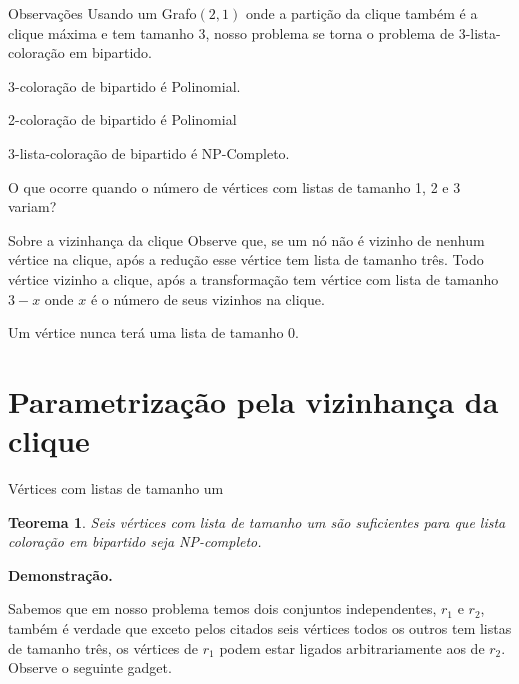 \documentclass[9pt, compress]{beamer}
\newtheorem{teorema}{Teorema}
\newcommand{\?}{\textcolor{warn}{\textit{?}}}
\begin{document}
     \begin{frame}{Observações}
       Usando um Grafo$(2,1)$ onde a partição da clique também é a clique máxima e tem tamanho 3, nosso problema se torna o problema de 3-lista-coloração em bipartido.
       
       3-coloração de bipartido é Polinomial.
       
       2-coloração de bipartido é Polinomial 
       
       3-lista-coloração de bipartido é NP-Completo.
       
       O que ocorre quando o número de vértices com listas de tamanho 1, 2 e 3 variam? 
     \end{frame}
     \begin{frame}{Sobre a vizinhança da clique}
       Observe que, se um nó não é vizinho de nenhum vértice na clique, após a redução esse vértice tem lista de tamanho três. Todo vértice vizinho a clique, após a transformação tem vértice com lista de tamanho $3-x$ onde $x$ é o número de seus vizinhos na clique.
       
       Um vértice nunca terá uma lista de tamanho 0.
     \end{frame}
     \section{Parametrização pela vizinhança da clique}
     \begin{frame}{Vértices com listas de tamanho um}
       \begin{teorema}
       Seis vértices com lista de tamanho um são suficientes para que lista coloração em bipartido seja NP-completo.
       \end{teorema}
       \textbf{Demonstração.}
       
       Sabemos que em nosso problema temos dois conjuntos independentes, $r_1$ e $r_2$, também é verdade que exceto pelos citados seis vértices todos os outros tem listas de tamanho três, os vértices de $r_1$ podem estar ligados arbitrariamente aos de $r_2$. Observe o seguinte gadget.
     \end{frame}
     
\end{document}
